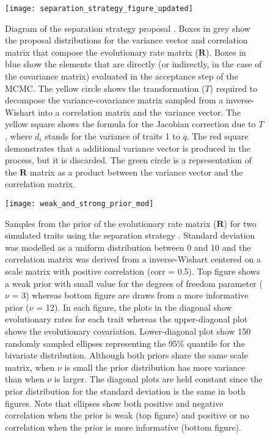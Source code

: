 \pagebreak

\begin{figure}[h]
	\centering
	\texttt{[image: separation\_strategy\_figure\_updated]}
	\caption[Diagram of the separation strategy proposal.]{Diagram of the separation strategy proposal \citep{barnard_modeling_2000}. Boxes in grey show the proposal distributions for the variance vector and correlation matrix that compose the evolutionary rate matrix ($\mathbf{R}$). Boxes in blue show the elements that are directly (or indirectly, in the case of the covariance matrix) evaluated in the acceptance step of the MCMC. The yellow circle shows the transformation ($T$) required to decompose the variance-covariance matrix sampled from a inverse-Wishart into a correlation matrix and the variance vector. The yellow square shows the formula for the Jacobian correction due to $T$ \citep{zhang_sampling_2006}, where $d_{i}$ stands for the variance of traits 1 to $q$. The red square demonstrates that a additional variance vector is produced in the process, but it is discarded. The green circle is a representation of the $\mathbf{R}$ matrix as a product between the variance vector and the correlation matrix.}
	\label{fig:proposal}
\end{figure}

\begin{figure}[h]
	\centering
	\texttt{[image: weak\_and\_strong\_prior\_mod]}
	\caption[Samples from the prior of the evolutionary rate matrix ($\mathbf{R}$) for two simulated traits using the separation strategy.]{Samples from the prior of the evolutionary rate matrix ($\mathbf{R}$) for two simulated traits using the separation strategy \citep{barnard_modeling_2000}. Standard deviation was modelled as a uniform distribution between 0 and 10 and the correlation matrix was derived from a inverse-Wishart centered on a scale matrix with positive correlation (corr = 0.5). Top figure shows a weak prior with small value for the degrees of freedom parameter ($\nu$ = 3) whereas bottom figure are draws from a more informative prior ($\nu$ = 12). In each figure, the plots in the diagonal show evolutionary rates for each trait whereas the upper-diagonal plot shows the evolutionary covariation. Lower-diagonal plot show 150 randomly sampled ellipses representing the 95\% quantile for the bivariate distribution. Although both priors share the same scale matrix, when $\nu$ is small the prior distribution has more variance than when $\nu$ is larger. The diagonal plots are held constant since the prior distribution for the standard deviation is the same in both figures. Note that ellipses show both positive and negative correlation when the prior is weak (top figure) and positive or no correlation when the prior is more informative (bottom figure).}
	\label{fig:prior_samples}
\end{figure}

